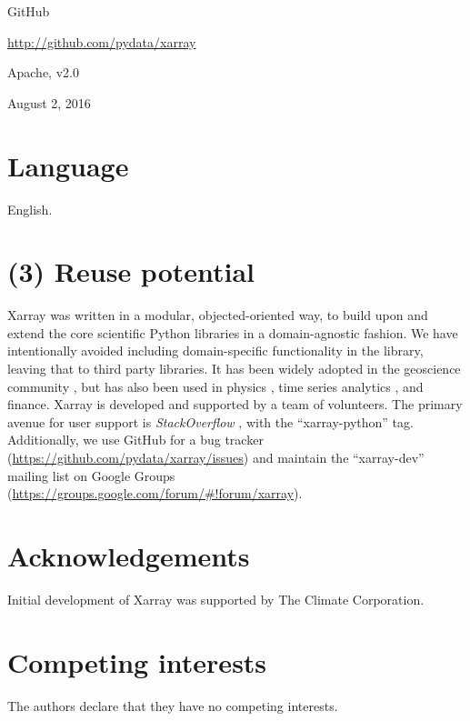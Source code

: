 \documentclass{jors}
\begin{document}
\begin{description}[noitemsep,topsep=0pt]
	\item[Name:] GitHub
	\item[Identifier:] \url{http://github.com/pydata/xarray}
	\item[Licence:] Apache, v2.0
	\item[Date published:] August 2, 2016
\end{description}

\section*{Language}

English.

\section*{(3) Reuse potential}

Xarray was written in a modular, objected-oriented way, to build upon and extend the core scientific Python libraries in a domain-agnostic fashion.
We have intentionally avoided including domain-specific functionality in the library, leaving that to third party libraries.
It has been widely adopted in the geoscience community \citep[e.g.][]{Dawson_2016a,Dawson_2016b,xgcm}, but has also been used in physics \citep[e.g.][]{pycalphad}, time series analytics \citep{cesium}, and finance.
Xarray is developed and supported by a team of volunteers. The primary avenue for user support is \textit{StackOverflow} \citep{stackoverflow}, with the ``xarray-python'' tag.
Additionally, we use GitHub for a bug tracker (\url{https://github.com/pydata/xarray/issues}) and maintain the ``xarray-dev'' mailing list on Google Groups (\url{https://groups.google.com/forum/#!forum/xarray}).

\section*{Acknowledgements}

Initial development of Xarray was supported by The Climate Corporation.

\section*{Competing interests}

The authors declare that they have no competing interests.
\end{document}
